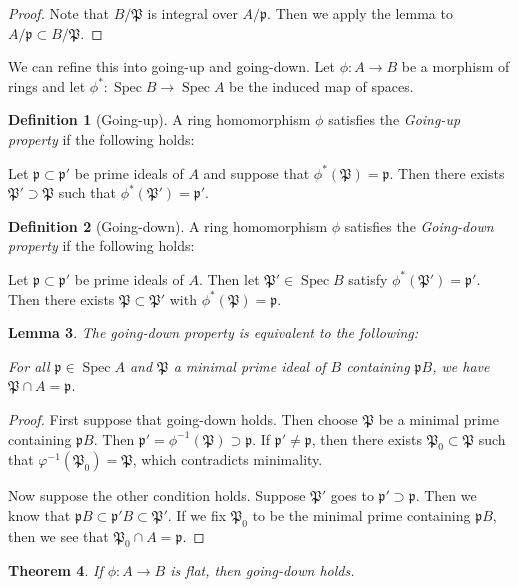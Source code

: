 \documentclass[leqno, openany]{memoir}
\newtheorem{thm}{Theorem}[section]
\newtheorem{lem}[thm]{Lemma}
\theoremstyle{definition}
\newtheorem{defn}[thm]{Definition}
\theoremstyle{remark}
\theoremstyle{plain}
\theoremstyle{definition}
\theoremstyle{remark}
\newcommand{\mf}[1]{\mathfrak{#1}}
\DeclareMathOperator{\Spec}{Spec}
\begin{document}
\begin{proof}
    Note that $B/ \mf{P}$ is integral over $A / \mf{p}$. Then we apply the lemma to $A / \mf{p} \subset B / \mf{P}$.
\end{proof}

We can refine this into going-up and going-down. Let $\phi: A \to B$ be a morphism of rings and let $\phi^*: \Spec B \to \Spec A$ be the induced map of spaces.

\begin{defn}[Going-up]
    A ring homomorphism $\phi$ satisfies the \textit{Going-up property} if the following holds:

    Let $\mf{p} \subset \mf{p}'$ be prime ideals of $A$ and suppose that $\phi^*(\mf{P}) = \mf{p}$. Then there exists $\mf{P}' \supset \mf{P}$ such that $\phi^*(\mf{P}') = \mf{p}'$.
\end{defn}

\begin{defn}[Going-down]
    A ring homomorphism $\phi$ satisfies the \textit{Going-down property} if the following holds:

    Let $\mf{p} \subset \mf{p}'$ be prime ideals of $A$. Then let $\mf{P}' \in \Spec B$ satisfy $\phi^*(\mf{P}') = \mf{p}'$. Then there exists $\mf{P} \subset \mf{P}'$ with $\phi^*(\mf{P}) = \mf{p}$.
\end{defn}

\begin{lem}
    \label{lem:goingdown}
    The going-down property is equivalent to the following:

    For all $\mf{p} \in \Spec A$ and $\mf{P}$ a minimal prime ideal of $B$ containing $\mf{p}B$, we have $\mf{P} \cap A = \mf{p}$.
\end{lem}

\begin{proof}
    First suppose that going-down holds. Then choose $\mf{P}$ be a minimal prime containing $\mf{p}B$. Then $\mf{p}' = \phi^{-1} (\mf{P}) \supset \mf{p}$. If $\mf{p}' \neq \mf{p}$, then there exists $\mf{P}_0 \subset \mf{P}$ such that $\varphi^{-1}(\mf{P}_0) = \mf{P}$, which contradicts minimality.

    Now suppose the other condition holds. Suppose $\mf{P}'$ goes to $\mf{p}' \supset \mf{p}$. Then we know that $\mf{p} B \subset \mf{p}' B \subset \mf{P}'$. If we fix $\mf{P}_0$ to be the minimal prime containing $\mf{p}B$, then we see that $\mf{P}_0 \cap A = \mf{p}$.
\end{proof}

\begin{thm}
    If $\phi: A \to B$ is flat, then going-down holds.
\end{thm}
\end{document}
